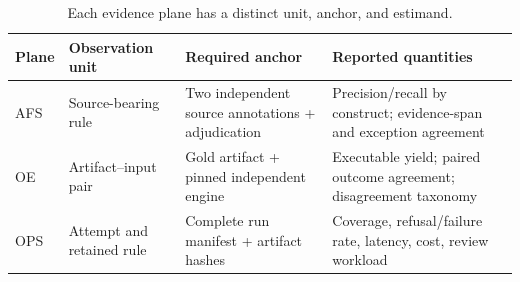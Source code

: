 \begin{table}[t]
\centering
\caption{Each evidence plane has a distinct unit, anchor, and estimand.}
\label{tab:evaluation-matrix}
\small
\begin{tabularx}{\linewidth}{@{}p{.10\linewidth}p{.22\linewidth}X p{.25\linewidth}@{}}
\toprule
Plane & Observation unit & Required anchor & Reported quantities \\
\midrule
AFS & Source-bearing rule & Two independent source annotations + adjudication & Precision/recall by construct; evidence-span and exception agreement \\
OE & Artifact--input pair & Gold artifact + pinned independent engine & Executable yield; paired outcome agreement; disagreement taxonomy \\
OPS & Attempt and retained rule & Complete run manifest + artifact hashes & Coverage, refusal/failure rate, latency, cost, review workload \\
\bottomrule
\end{tabularx}
\end{table}
